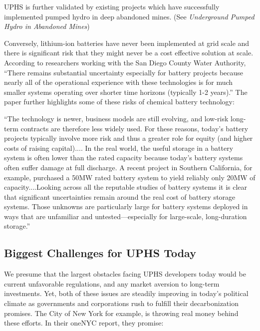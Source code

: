 \documentclass[hidelinks,12pt,a4paper]{article}
\begin{document}
UPHS is further validated by existing projects which have successfully implemented pumped hydro in deep abandoned mines. (See \textit{Underground Pumped Hydro in Abandoned Mines})

Conversely, lithium-ion batteries have never been implemented at grid scale and there is significant risk that they might never be a cost effective solution at scale. According to researchers working with the San Diego County Water Authority, “There remains substantial uncertainty especially for battery projects because nearly all of the operational experience with these technologies is for much smaller systems operating over shorter time horizons (typically 1-2 years).” \cite{PumpedEnergyStorageVitalToCalifornia} The paper further highlights some of these risks of chemical battery technology:

\begin{displayquote}
“The technology is newer, business models are still evolving, and low-risk long-term contracts are therefore less widely used. For these reasons, today’s battery projects typically involve more risk and thus a greater role for equity (and higher costs of raising capital).... In the real world,
the useful storage in a battery system is often lower than the rated capacity because today’s battery systems often suffer damage at full discharge. A recent project in Southern California, for example, purchased a 50MW rated battery system to yield reliably only 20MW of capacity....Looking across all the reputable studies of battery systems it is clear that significant uncertainties remain around the real cost of battery storage systems. Those unknowns are particularly large for battery systems deployed in ways that are unfamiliar and untested—especially for large-scale, long-duration storage.” \cite{PumpedEnergyStorageVitalToCalifornia}
\end{displayquote}


\subsection{Biggest Challenges for UPHS Today}
We presume that the largest obstacles facing UPHS developers today would be current unfavorable regulations, and any market aversion to long-term investments. Yet, both of these issues are steadily improving in today's political climate as governments and corporations rush to fulfill their decarbonization promises. The City of New York for example, is throwing real money behind these efforts. In their oneNYC report, they promise:
\end{document}
